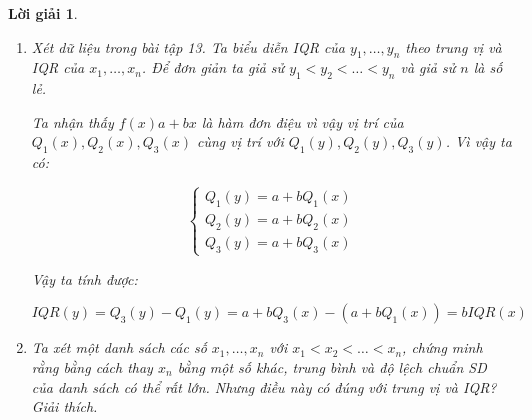 \documentclass[14pt, a4paper]{article}
\theoremstyle{sltheorem}
\theoremstyle{soltheorem}
\newtheorem*{loigiai}{Lời giải}
\begin{document}
\begin{loigiai}
\begin{enumerate}[wide, labelwidth=!, labelindent=0pt,label=\textbf{\arabic*}.]
        \begin{equation*}
            \begin{aligned}
                SD(y) &= \sqrt{\dfrac{1}{n}\sum_{i=1}^n (y_i - \bar{y})^2} \\
                &= \sqrt{\dfrac{1}{n} \sum_{i=1}^n (a + b x_i - (a + b \bar{x})^2)} \\
                &= \sqrt{\dfrac{b^2}{n} \sum_{i=1}^n (x - x_i)^2} \\
                &= b \sqrt{\dfrac{1}{n}\sum_{i=1}^n (x - x_i)^2} \\
                &= b SD(x)
            \end{aligned}
        \end{equation*}

        Vậy ta có:

        \begin{equation*}
            \begin{cases}
                \bar{y} = a + b \bar{x} \\
                SD(y) = b SD(x)
            \end{cases}
        \end{equation*}

        \item Xét dữ liệu trong bài tập 13. Ta biểu diễn IQR của $y_1, \dots, y_n$ theo trung vị và IQR của $x_1, \dots, x_n$.
        Để đơn giản ta giả sử $y_1 < y_2 < \dots < y_n$ và giả sử $n$ là số lẻ.

        Ta nhận thấy $f(x) a + bx$ là hàm đơn điệu vì vậy vị trí của $Q_1(x), Q_2(x), Q_3 (x)$ cùng vị trí với $Q_1(y), Q_2(y), Q_3(y)$.
        Vì vậy ta có:

        \begin{equation*}
            \begin{cases}
                Q_1 (y) = a + bQ_1(x) \\
                Q_2 (y) = a + b Q_2(x) \\
                Q_3 (y) = a + b Q_3(x)
            \end{cases}
        \end{equation*}

        Vậy ta tính được:

        \begin{equation*}
            IQR(y) = Q_3 (y) - Q_1 (y) = a + b Q_3(x) - (a + b Q_1(x)) = b IQR(x)
        \end{equation*}

        \item Ta xét một danh sách các số $x_1, \dots, x_n$ với $x_1 < x_2 < \dots < x_n$, chứng minh rằng bằng cách thay $x_n$ bằng một số khác, trung bình và độ lệch chuẩn SD của danh sách có thể rất lớn.
        Nhưng điều này có đúng với trung vị và IQR? Giải thích.


\end{enumerate}
\end{loigiai}
\end{document}
